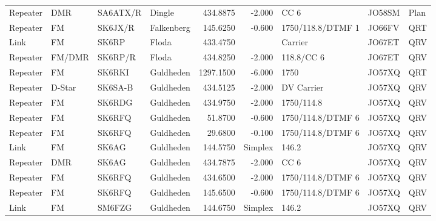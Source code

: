 {\begin{landscape}
\begin{longtable}{llllrrlll}
	Repeater          & DMR             & SA6ATX/R & Dingle                &     434.8875 &     -2.000 & CC 6              & JO58SM      & Plan     \\
	Repeater          & FM              & SK6JX/R  & Falkenberg            &     145.6250 &     -0.600 & 1750/118.8/DTMF 1 & JO66FV      & QRT      \\
	Link              & FM              & SK6RP    & Floda                 &     433.4750 &            & Carrier           & JO67ET      & QRV      \\
	Repeater          & FM/DMR          & SK6RP/R  & Floda                 &     434.8250 &     -2.000 & 118.8/CC 6        & JO67ET      & QRV      \\
	Repeater          & FM              & SK6RKI   & Guldheden             &    1297.1500 &     -6.000 & 1750              & JO57XQ      & QRT      \\
	Repeater          & D-Star          & SK6SA-B  & Guldheden             &     434.5125 &     -2.000 & DV Carrier        & JO57XQ      & QRV      \\
	Repeater          & FM              & SK6RDG   & Guldheden             &     434.9750 &     -2.000 & 1750/114.8        & JO57XQ      & QRV      \\
	Repeater          & FM              & SK6RFQ   & Guldheden             &      51.8700 &     -0.600 & 1750/114.8/DTMF 6 & JO57XQ      & QRV      \\
	Repeater          & FM              & SK6RFQ   & Guldheden             &      29.6800 &     -0.100 & 1750/114.8/DTMF 6 & JO57XQ      & QRV      \\
	Link              & FM              & SK6AG    & Guldheden             &     144.5750 &    Simplex & 146.2             & JO57XQ      & QRV      \\
	Repeater          & DMR             & SK6AG    & Guldheden             &     434.7875 &     -2.000 & CC 6              & JO57XQ      & QRV      \\
	Repeater          & FM              & SK6RFQ   & Guldheden             &     434.6500 &     -2.000 & 1750/114.8/DTMF 6 & JO57XQ      & QRV      \\
	Repeater          & FM              & SK6RFQ   & Guldheden             &     145.6500 &     -0.600 & 1750/114.8/DTMF 6 & JO57XQ      & QRV      \\
	Link              & FM              & SM6FZG   & Guldheden             &     144.6750 &    Simplex & 146.2             & JO57XQ      & QRV      \\

\end{longtable}
\end{landscape}}
